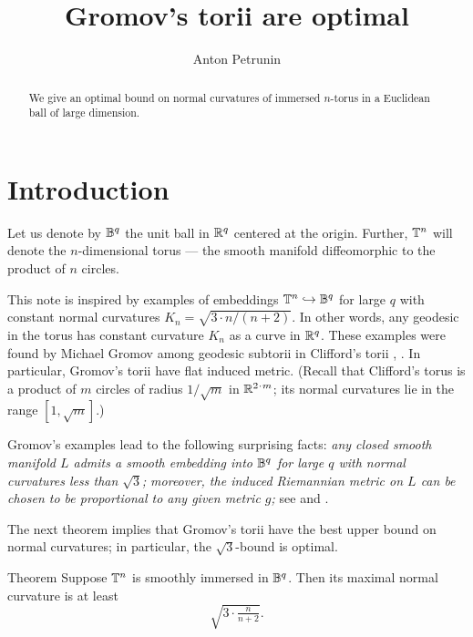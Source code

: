 \documentclass[a4paper,10pt]{article}
\def\thetitle{Gromov's torii are optimal}
\def\theauthors{Anton Petrunin}
\begin{document}


\title{\thetitle}
\author{\theauthors}
\date{}
\maketitle

\begin{abstract}
We give an optimal bound on normal curvatures of immersed $n$-torus in a Euclidean ball of large dimension. 
\end{abstract}

\section{Introduction}

Let us denote by $\mathbb{B}^q$ the unit ball in $\mathbb{R}^q$ centered at the origin.
Further, $\mathbb{T}^n$ will denote the $n$-dimensional torus --- the smooth manifold diffeomorphic to the product of $n$ circles.

This note is inspired by examples of embeddings $\mathbb{T}^n\hookrightarrow\mathbb{B}^q$ for large $q$ with constant normal curvatures $K_n=\sqrt{3\cdot n/(n+2)}$.
In other words, any geodesic in the torus has constant curvature $K_n$ as a curve in $\mathbb{R}^q$.
These examples were found by Michael Gromov among geodesic subtorii in Clifford's torii 
\cite[2.A]{gromov3}, \cite[1.1.A.]{gromov2}.
In particular, Gromov's torii have flat induced metric.
(Recall that Clifford's torus is a product of $m$  circles of radius ${1}/{\sqrt{m}}$ in $\RR^{2\cdot m}$;
its normal curvatures lie in the range $[1,\sqrt{m}]$.)


Gromov's examples lead to the following surprising facts:
\textit{any closed smooth manifold $L$ admits a smooth embedding into $\mathbb{B}^q$ for large $q$ with normal curvatures less than $\sqrt{3}$;}
\textit{moreover, the induced Riemannian metric on $L$ can be chosen to be proportional to any given metric $g$;}
see \cite[1.D]{gromov3} and \cite[1.1.C]{gromov2}.

The next theorem implies that Gromov's torii have the best upper bound on normal curvatures;
in particular, the $\sqrt3$-bound is optimal.

\begin{thm}{Theorem}
\label{thm:main}
Suppose $\mathbb{T}^n$ is smoothly immersed in $\mathbb{B}^q$.
Then its maximal normal curvature is at least 
\[\sqrt{3\cdot \tfrac{n}{n+2}}.\]
\end{thm}
\end{document}
